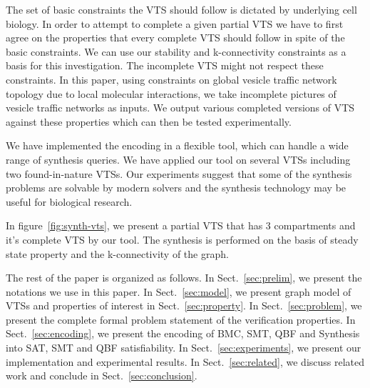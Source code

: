%
The set of basic constraints the VTS should follow is dictated by underlying cell biology.   
%
In order to attempt to complete a given partial VTS we have to first agree on the properties that every complete VTS should follow in spite of the basic constraints. 
%
We can use our stability and k-connectivity constraints as a basis for this investigation.   
%
The incomplete VTS might not respect these constraints. 
%
In this paper, using constraints on global vesicle traffic network topology due to local molecular interactions, we take incomplete pictures of vesicle traffic networks as inputs.
%
We output various completed versions of VTS against these properties which can then be tested experimentally.
%

We have implemented the encoding in a flexible tool, which can handle a wide range of synthesis queries. 
%
We have applied our tool on several VTSs including
two found-in-nature VTSs.
%
Our experiments suggest that some of the synthesis problems are solvable by modern solvers and the synthesis technology may be useful for biological research.
%
\begin{example}
	In figure~\ref{fig:synth-vts}, we present a partial VTS that has 3 compartments and it's complete VTS by our tool. The synthesis is performed on the basis of steady state property and the  k-connectivity of the graph.
	
\end{example}


The rest of the paper is organized as follows. 
%
In Sect.~\ref{sec:prelim}, we present the notations we use in this paper. 
%
In Sect.~\ref{sec:model}, we present graph model of VTSs and  properties of interest in Sect.~\ref{sec:property}.
%
%
%
In Sect.~\ref{sec:problem}, we present the complete formal problem statement of the verification properties.
%
In Sect.~\ref{sec:encoding}, we present the encoding of BMC, SMT, QBF and Synthesis into SAT, SMT and QBF satisfiability. 
%
In Sect.~\ref{sec:experiments}, we present our implementation and experimental results. 
%
In Sect.~\ref{sec:related}, we discuss related work and conclude in Sect.~\ref{sec:conclusion}.


~        
